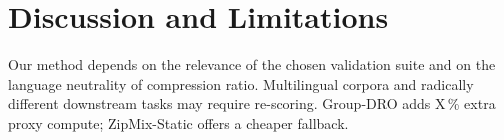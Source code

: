 \documentclass{article}
\begin{document}
\section{Discussion and Limitations}\label{sec:discussion}
Our method depends on the relevance of the chosen validation suite and on the
language neutrality of compression ratio.  Multilingual corpora and radically
different downstream tasks may require re-scoring.  Group-DRO adds
X\,\% extra proxy compute; ZipMix-Static offers a cheaper fallback.



\end{document}
